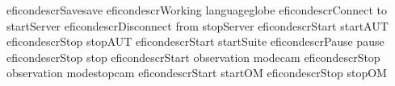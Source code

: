 \begin{gdreficon}
  \app{}eficondescr{Save}{save}
  \app{}eficondescr{Working language}{globe}
  \app{}eficondescr{Connect to \gdagent}{startServer}
  \app{}eficondescr{Disconnect from \gdagent}{stopServer}
  \app{}eficondescr{Start \gdaut{}}{startAUT}
  \app{}eficondescr{Stop \gdaut{}}{stopAUT}
  \app{}eficondescr{Start \gdsuite{}}{startSuite}
  \app{}eficondescr{Pause \gdsuite{}}{pause}
  \app{}eficondescr{Stop \gdsuite{}}{stop}
  \app{}eficondescr{Start observation mode}{cam}
  \app{}eficondescr{Stop observation mode}{stopcam}
  \app{}eficondescr{Start \gdomm{}}{startOM}
  \app{}eficondescr{Stop \gdomm{}}{stopOM}
\end{gdreficon}
